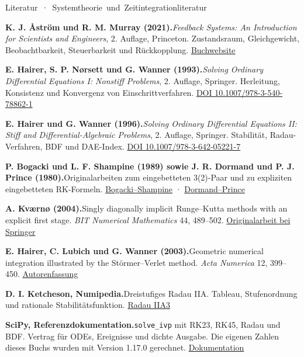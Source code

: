 \unit{Literatur · Systemtheorie und Zeitintegration}{literatur}
\newcommand{\lititem}[3]{\par\raggedright\vspace{3.2pt}\hypertarget{lit-#1}{}{\sffamily\bfseries\color{ink}#2}\enspace #3\par}
\lititem{sy}{K. J. Åström und R. M. Murray (2021).}{\emph{Feedback Systems: An Introduction for Scientists and Engineers}, 2. Auflage, Princeton. Zustandsraum, Gleichgewicht, Beobachtbarkeit, Steuerbarkeit und Rückkopplung. \href{https://fbsbook.org/}{Buchwebsite}}
\lititem{ode}{E. Hairer, S. P. Nørsett und G. Wanner (1993).}{\emph{Solving Ordinary Differential Equations I: Nonstiff Problems}, 2. Auflage, Springer. Herleitung, Konsistenz und Konvergenz von Einschrittverfahren. \href{https://doi.org/10.1007/978-3-540-78862-1}{DOI 10.1007/978-3-540-78862-1}}
\lititem{stiff}{E. Hairer und G. Wanner (1996).}{\emph{Solving Ordinary Differential Equations II: Stiff and Differential-Algebraic Problems}, 2. Auflage, Springer. Stabilität, Radau-Verfahren, BDF und DAE-Index. \href{https://doi.org/10.1007/978-3-642-05221-7}{DOI 10.1007/978-3-642-05221-7}}
\lititem{paare}{P. Bogacki und L. F. Shampine (1989) sowie J. R. Dormand und P. J. Prince (1980).}{Originalarbeiten zum eingebetteten 3(2)-Paar und zu expliziten eingebetteten RK-Formeln. \href{https://doi.org/10.1016/0893-9659(89)90079-7}{Bogacki--Shampine} · \href{https://doi.org/10.1016/0771-050X(80)90013-3}{Dormand--Prince}}
\lititem{esdirk}{A. Kværnø (2004).}{Singly diagonally implicit Runge--Kutta methods with an explicit first stage. \emph{BIT Numerical Mathematics} 44, 489--502. \href{https://doi.org/10.1023/B:BITN.0000046811.70614.38}{Originalarbeit bei Springer}}
\lititem{geom}{E. Hairer, C. Lubich und G. Wanner (2003).}{Geometric numerical integration illustrated by the Störmer--Verlet method. \emph{Acta Numerica} 12, 399--450. \href{https://www.unige.ch/~hairer/preprints/gniverlet.html}{Autorenfassung}}
\lititem{radtab}{D. I. Ketcheson, Numipedia.}{Dreistufiges Radau IIA. Tableau, Stufenordnung und rationale Stabilitätsfunktion. \href{https://ketch.github.io/numipedia/methods/RadauIIA3.html}{Radau IIA3}}
\lititem{scipy}{SciPy, Referenzdokumentation.}{\texttt{solve\_ivp} mit RK23, RK45, Radau und BDF. Vertrag für ODEs, Ereignisse und dichte Ausgabe. Die eigenen Zahlen dieses Buchs wurden mit Version 1.17.0 gerechnet. \href{https://docs.scipy.org/doc/scipy/reference/generated/scipy.integrate.solve_ivp.html}{Dokumentation}}

